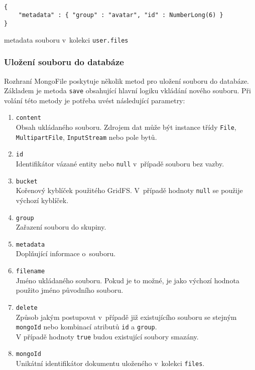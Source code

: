 \begin{example}
\centering
\begin{lstlisting}

{
    "metadata" : { "group" : "avatar", "id" : NumberLong(6) }
}
\end{lstlisting}
\caption{metadata souboru v~kolekci \texttt{user.files}}
\end{example}


\subsubsection{\textbf{Uložení souboru do databáze}}
Rozhraní MongoFile poskytuje několik metod pro uložení souboru do databáze. Základem je metoda \texttt{save} obsahující hlavní logiku vkládání nového souboru. Při volání této metody je potřeba uvést následující parametry:
\begin{enumerate}
\item \texttt{content}\\
Obsah ukládaného souboru. Zdrojem dat může být instance třídy \texttt{File}, \texttt{MultipartFile}, \texttt{InputStream} nebo pole bytů.
\item \texttt{id}\\
Identifikátor vázané entity nebo \texttt{null} v~případě souboru bez vazby.
\item \texttt{bucket}\\
Kořenový kyblíček použitého GridFS. V~případě hodnoty \texttt{null} se použije výchozí kyblíček.
\item \texttt{group}\\
Zařazení souboru do skupiny.
\item \texttt{metadata}\\
Doplňující informace o~souboru.
\item \texttt{filename}\\
Jméno ukládaného souboru. Pokud je to možné, je jako výchozí hodnota použito jméno původního souboru.
\item \texttt{delete}\\
Způsob jakým postupovat v~případě již existujícího souboru se stejným \texttt{mongoId} nebo kombinací atributů \texttt{id} a \texttt{group}.
\\V případě hodnoty \texttt{true} budou existující soubory smazány.
\item \texttt{mongoId}\\
Unikátní identifikátor dokumentu uloženého v~kolekci \texttt{files}.
\end{enumerate}

